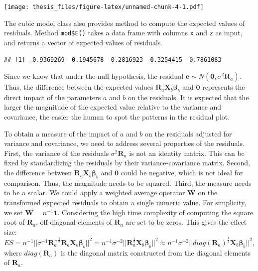 \documentclass{monashthesis}
\theoremstyle{definition}
\theoremstyle{definition}
\theoremstyle{definition}
\theoremstyle{definition}
\theoremstyle{remark}
\begin{document}
\texttt{[image: thesis\_files/figure-latex/unnamed-chunk-4-1.pdf]}

The cubic model class also provides method to compute the expected values of residuals. Method \texttt{mod\$E()} takes a data frame with columns \texttt{x} and \texttt{z} as input, and returns a vector of expected values of residuals.

\begin{Shaded}
\begin{Highlighting}[]
\SpecialCharTok{$}\SpecialCharTok{$}\NormalTok{(} \NormalTok{))}
\end{Highlighting}
\end{Shaded}

\begin{verbatim}
## [1] -0.9369269  0.1945678  0.2816923 -0.3254415  0.7861083
\end{verbatim}

Since we know that under the null hypothesis, the residual \(\boldsymbol{e}\sim N(\boldsymbol{0},\sigma^2\boldsymbol{R}_a)\). Thus, the difference between the expected values \(\boldsymbol{R}_a\boldsymbol{X}_b\boldsymbol{\beta}_b\) and \(\boldsymbol{0}\) represents the direct impact of the parameters \(a\) and \(b\) on the residuals. It is expected that the larger the magnitude of the expected value relative to the variance and covariance, the easier the human to spot the patterns in the residual plot.

To obtain a measure of the impact of \(a\) and \(b\) on the residuals adjusted for variance and covariance, we need to address several properties of the residuals. First, the variance of the residuals \(\sigma^2\boldsymbol{R}_a\) is not an identity matrix. This can be fixed by standardizing the residuals by their variance-covariance matrix. Second, the difference between \(\boldsymbol{R}_a\boldsymbol{X}_b\boldsymbol{\beta}_b\) and \(\boldsymbol{0}\) could be negative, which is not ideal for comparison. Thus, the magnitude needs to be squared. Third, the measure needs to be a scalar. We could apply a weighted average operator \(\boldsymbol{W}\) on the transformed expected residuals to obtain a single numeric value. For simplicity, we set \(\boldsymbol{W}=n^{-1}\boldsymbol{1}\). Considering the high time complexity of computing the square root of \(\boldsymbol{R}_a\), off-diagonal elements of \(\boldsymbol{R}_a\) are set to be zeros. This gives the effect size: \[ES=n^{-1}||\sigma^{-1}\boldsymbol{R}_a^{-\frac{1}{2}}\boldsymbol{R}_a\boldsymbol{X}_b\boldsymbol{\beta}_b||^2=n^{-1}\sigma^{-2}||\boldsymbol{R}_a^{\frac{1}{2}}\boldsymbol{X}_b\boldsymbol{\beta}_b||^2\approx n^{-1}\sigma^{-2}||diag(\boldsymbol{R}_a)^{\frac{1}{2}}\boldsymbol{X}_b\boldsymbol{\beta}_b||^2,\] where \(diag(\boldsymbol{R}_a)\) is the diagonal matrix constructed from the diagonal elements of \(\boldsymbol{R}_a\).
\end{document}
